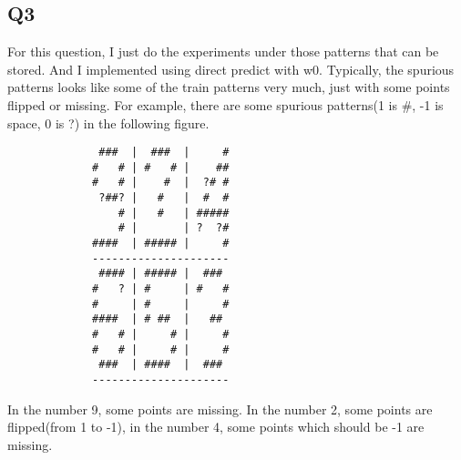 \documentclass{article}
\begin{document}
  \subsection{Q3}
  For this question, I just do the experiments under those patterns that can be
  stored. And I implemented using direct predict with w0. Typically, the
  spurious patterns looks like some of the train patterns very much, just with
  some points flipped or missing. For example, there are some spurious
  patterns(1 is \#, -1 is space, 0 is ?) in the following figure.\\
  \begin{verbatim}
              ###  |  ###  |     #
             #   # | #   # |    ## 
             #   # |    #  |  ?# #
              ?##? |   #   |  #  #
                 # |   #   | #####
                 # |       | ?  ?# 
             ####  | ##### |     # 
             ---------------------
              #### | ##### |  ###
             #   ? | #     | #   #
             #     | #     |     #
             ####  | # ##  |   ##
             #   # |     # |     #
             #   # |     # |     #
              ###  | ####  |  ###
             ---------------------
  \end{verbatim}
  In the number 9, some points are missing. In the number 2, some points are
  flipped(from 1 to -1), in the number 4, some points which should be -1 are missing.\\
\end{document}
